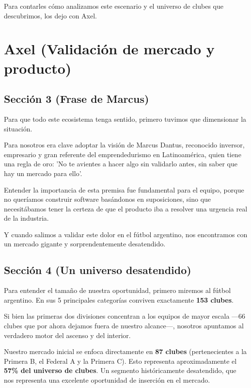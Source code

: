 Para contarles cómo analizamos este escenario y el universo de clubes que descubrimos, los dejo con Axel.

\newpage

\section{Axel (Validación de mercado y producto)}

\subsection{Sección 3 (Frase de Marcus)}

Para que todo este ecosistema tenga sentido, primero tuvimos que dimensionar la situación.

Para nosotros era clave adoptar la visión de Marcus Dantus, reconocido inversor, empresario y gran referente del emprendedurismo en Latinoamérica, quien tiene una regla de oro: 'No te avientes a hacer algo sin validarlo antes, sin saber que hay un mercado para ello'.

Entender la importancia de esta premisa fue fundamental para el equipo, porque no queríamos construir software basándonos en suposiciones, sino que necesitábamos tener la certeza de que el producto iba a resolver una urgencia real de la industria.

Y cuando salimos a validar este dolor en el fútbol argentino, nos encontramos con un mercado gigante y sorprendentemente desatendido.

\subsection{Sección 4 (Un universo desatendido)}

Para entender el tamaño de nuestra oportunidad, primero miremos al fútbol argentino. En sus 5 principales categorías conviven exactamente \textbf{153 clubes}. 

Si bien las primeras dos divisiones concentran a los equipos de mayor escala —66 clubes que por ahora dejamos fuera de nuestro alcance—, nosotros apuntamos al verdadero motor del ascenso y del interior. 

Nuestro mercado inicial se enfoca directamente en \textbf{87 clubes} (pertenecientes a la Primera B, el Federal A y la Primera C). Esto representa aproximadamente el \textbf{57\% del universo de clubes}. Un segmento históricamente desatendido, que nos representa una excelente oportunidad de inserción en el mercado.


